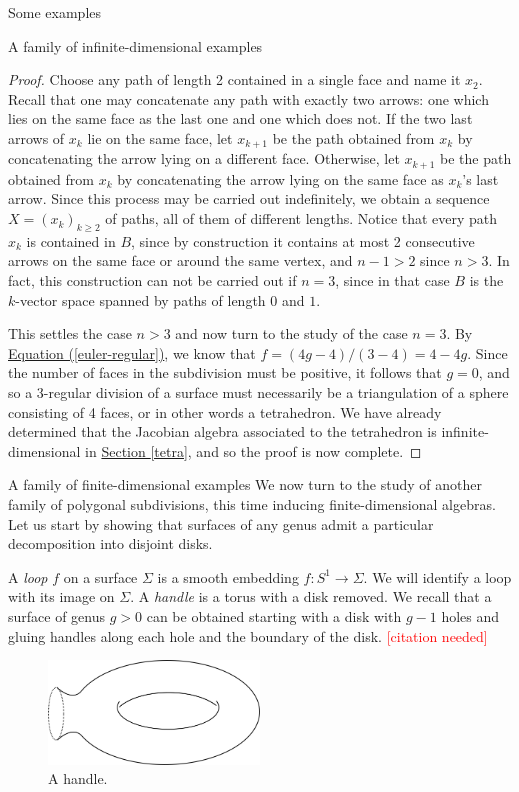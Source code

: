 \begin{chapter}{Some examples}
\begin{section}{A family of infinite-dimensional examples}
\begin{proof}
Choose any path of length 2 contained in a single face and name it $x_2$. Recall that one may concatenate any path with exactly two arrows: one which lies on the same face as the last one and one which does not. If the two last arrows of $x_k$ lie on the same face, let $x_{k+1}$ be the path obtained from $x_k$ by concatenating the arrow lying on a different face. Otherwise, let $x_{k+1}$ be the path obtained from $x_k$ by concatenating the arrow lying on the same face as $x_k$'s last arrow. Since this process may be carried out indefinitely, we obtain a sequence $X=(x_k)_{k\geq 2}$ of paths, all of them of different lengths. Notice that every path $x_k$ is contained in $B$, since by construction it contains at most 2 consecutive arrows on the same face or around the same vertex, and $n-1 > 2$ since $n>3$. In fact, this construction can not be carried out if $n=3$, since in that case $B$ is the $k$-vector space spanned by paths of length $0$ and $1$.

This settles the case $n>3$ and now turn to the study of the case $n=3$. By \hyperref[euler-regular]{Equation (\ref*{euler-regular})}, we know that $f=(4g-4)/(3-4)= 4-4g$. Since the number of faces in the subdivision must be positive, it follows that $g=0$, and so a 3-regular division of a surface must necessarily be a triangulation of a sphere consisting of 4 faces, or in other words a tetrahedron. We have already determined that the Jacobian algebra associated to the tetrahedron is infinite-dimensional in \hyperref[tetra]{Section \ref*{tetra}}, and so the proof is now complete.
\end{proof}
\end{section}

\begin{section}{A family of finite-dimensional examples}
We now turn to the study of another family of polygonal subdivisions, this time inducing finite-dimensional algebras. Let us start by showing that surfaces of any genus admit a particular decomposition into disjoint disks.

A \emph{loop} $f$ on a surface $\Sigma$ is a smooth embedding $f:S^1\to \Sigma$. We will identify a loop with its image on $\Sigma$. A \emph{handle} is a torus with a disk removed. We recall that a surface of genus $g>0$ can be obtained starting with a disk with $g-1$ holes and gluing handles along each hole and the boundary of the disk. \textcolor{red}{[citation needed]}

\begin{figure}[h]
\centering
	\includegraphics[width=0.5\textwidth]{handle.png}
\caption{A handle.}
\end{figure}


\end{section}
\end{chapter}
